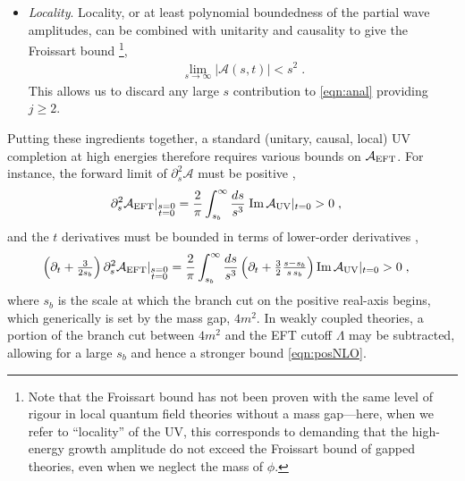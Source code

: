 \documentclass[11pt]{article}
\begin{document}
\begin{itemize}
\item \emph{Locality}. 
Locality, or at least polynomial boundedness of the partial wave amplitudes, can be combined with unitarity and causality to give the Froissart bound \cite{PhysRev.123.1053, Martin:1962rt, Jin:1964zza}\footnote{
Note that the Froissart bound has not been proven with the same level of rigour in local quantum field theories without a mass gap---here, when we refer to ``locality'' of the UV, this corresponds to demanding that the high-energy growth amplitude do not exceed the Froissart bound of gapped theories, even when we neglect the mass of $\phi$. 
}, 
\begin{align}
\lim_{s\to \infty} | \mathcal{A} (s,t) | < s^2 \; . 
\label{eqn:Froissart}
\end{align} 
This allows us to discard any large $s$ contribution to \eqref{eqn:anal} providing $j \geq 2$.

\end{itemize}
Putting these ingredients together,
a standard (unitary, causal, local) UV completion at high energies therefore requires various bounds on $\mathcal{A}_{\rm EFT}$. For instance, the forward limit of $\partial_s^2 \mathcal{A}$ must be positive \cite{Adams:2006sv},
\begin{align}
 \partial_s^2 \mathcal{A}_{\rm EFT}  |_{\substack{s=0 \\ t=0 }} &=  \frac{2}{\pi} \int_{s_b}^{\infty} \frac{ds}{s^3}  \; \text{Im} \, \mathcal{A}_{\rm UV} |_{t=0}   > 0     \; , \label{eqn:posLO}   
\end{align}
and the $t$ derivatives must be bounded in terms of lower-order derivatives \cite{Vecchi:2007na, Nicolis:2009qm, deRham:2017avq}, 
\begin{align}
 \left( \partial_t + \tfrac{3}{2 s_b}   \right) \partial_s^2 \mathcal{A}_{\rm EFT}  |_{\substack{s=0 \\ t=0 }} &=  \frac{2}{\pi} \int_{s_b}^{\infty} \frac{ds}{s^3}  \left( \partial_t + \tfrac{3}{2} \tfrac{s - s_b}{s \, s_b}   \right) \text{Im} \, \mathcal{A}_{\rm UV} |_{t=0}   > 0  \; , \label{eqn:posNLO} 
\end{align}
where $s_b$ is the scale at which the branch cut on the positive real-axis begins, which generically is set by the mass gap, $4m^2$.
In weakly coupled theories, a portion of the branch cut between $4m^2$ and the EFT cutoff $\Lambda$ may be subtracted, allowing for a large $s_b$ and hence a stronger bound \eqref{eqn:posNLO}. 
\end{document}
